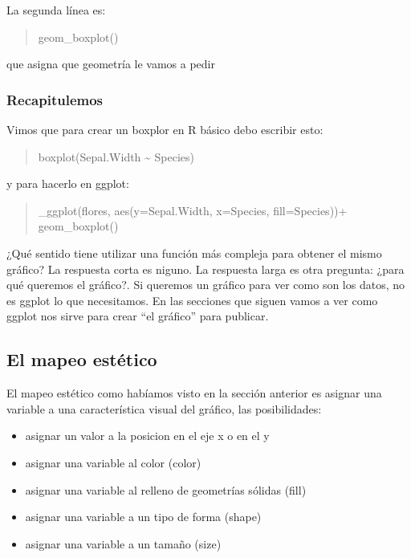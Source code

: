 \documentclass[
]{book}
\begin{document}
La segunda línea es:

\begin{quote}
geom\_boxplot()
\end{quote}

que asigna que geometría le vamos a pedir

\hypertarget{recapitulemos}{%
\subsubsection{Recapitulemos}\label{recapitulemos}}

Vimos que para crear un boxplor en R básico debo escribir esto:

\begin{quote}
boxplot(Sepal.Width \textasciitilde{} Species)
\end{quote}

y para hacerlo en ggplot:

\begin{quote}
\_ggplot(flores, aes(y=Sepal.Width, x=Species, fill=Species))+
geom\_boxplot()
\end{quote}

¿Qué sentido tiene utilizar una función más compleja para obtener el mismo gráfico? La respuesta corta es niguno. La respuesta larga es otra pregunta: ¿para qué queremos el gráfico?. Si queremos un gráfico para ver como son los datos, no es ggplot lo que necesitamos. En las secciones que siguen vamos a ver como ggplot nos sirve para crear ``el gráfico'' para publicar.

\hypertarget{el-mapeo-estuxe9tico}{%
\subsection{El mapeo estético}\label{el-mapeo-estuxe9tico}}

El mapeo estético como habíamos visto en la sección anterior es asignar una variable a una característica visual del gráfico, las posibilidades:

\begin{itemize}
\item
  asignar un valor a la posicion en el eje x o en el y
\item
  asignar una variable al color (color)
\item
  asignar una variable al relleno de geometrías sólidas (fill)
\item
  asignar una variable a un tipo de forma (shape)
\item
  asignar una variable a un tamaño (size)
\end{itemize}
\end{document}
